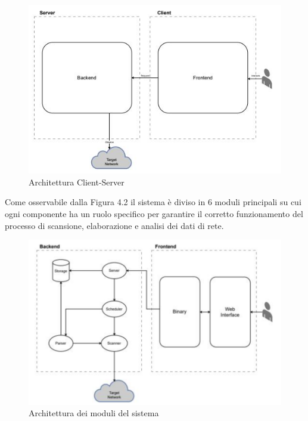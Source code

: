 \documentclass[target=bach,aauheader=,style=]{thud}
\begin{document}
\begin{figure}[t]
  \includegraphics[width=\columnwidth]{client_server}
  \centering
  \caption{Architettura Client-Server}
  \label{client-server}
\end{figure}

\FloatBarrier

Come osservabile dalla Figura 4.2 il sistema è diviso in 6 moduli principali su cui ogni componente ha un ruolo specifico per garantire il corretto funzionamento del processo di scansione, elaborazione e analisi dei dati di rete. 


\begin{figure}[t]
  \includegraphics[width=\columnwidth]{moduli}
  \centering
  \caption{Architettura dei moduli del sistema}
  \label{moduli}
\end{figure}

\FloatBarrier
\end{document}
